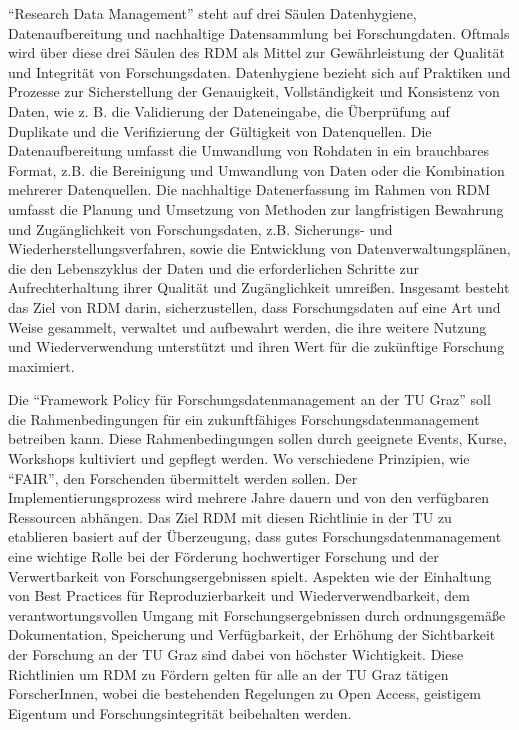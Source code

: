 \documentclass[9pt,english,ngerman]{scrartcl}
\begin{document}
``Research Data Management'' steht auf drei Säulen Datenhygiene, Datenaufbereitung und
nachhaltige Datensammlung bei Forschungdaten. Oftmals wird über
diese drei Säulen des RDM als Mittel zur Gewährleistung der Qualität und
Integrität von Forschungsdaten. Datenhygiene bezieht sich auf Praktiken
und Prozesse zur Sicherstellung der Genauigkeit, Vollständigkeit und
Konsistenz von Daten, wie z. B. die Validierung der Dateneingabe, die
Überprüfung auf Duplikate und die Verifizierung der Gültigkeit von Datenquellen.
Die Datenaufbereitung umfasst die Umwandlung von Rohdaten in ein brauchbares
Format, z.B. die Bereinigung und Umwandlung von Daten oder die Kombination
mehrerer Datenquellen. Die nachhaltige Datenerfassung im Rahmen von
RDM umfasst die Planung und Umsetzung von Methoden zur langfristigen
Bewahrung und Zugänglichkeit von Forschungsdaten, z.B.
Sicherungs- und Wiederherstellungsverfahren, sowie die Entwicklung
von Datenverwaltungsplänen, die den Lebenszyklus der Daten und
die erforderlichen Schritte zur Aufrechterhaltung ihrer Qualität
und Zugänglichkeit umreißen. Insgesamt besteht das Ziel von RDM darin,
sicherzustellen, dass Forschungsdaten auf eine Art und Weise gesammelt,
verwaltet und aufbewahrt werden, die ihre weitere Nutzung und
Wiederverwendung unterstützt und ihren Wert für die zukünftige Forschung maximiert.

Die ``Framework Policy für Forschungsdatenmanagement an der TU Graz'' soll die
Rahmenbedingungen für ein zukunftfähiges Forschungsdatenmanagement betreiben
kann. Diese Rahmenbedingungen sollen durch geeignete Events, Kurse, Workshops
kultiviert und gepflegt werden. Wo verschiedene Prinzipien, wie ``FAIR'', den
Forschenden übermittelt werden sollen. Der Implementierungsprozess wird mehrere
Jahre dauern und von den verfügbaren Ressourcen abhängen. Das Ziel RDM mit
diesen Richtlinie in der TU zu etablieren basiert auf der Überzeugung, dass
gutes Forschungsdatenmanagement eine wichtige Rolle bei der Förderung
hochwertiger Forschung und der Verwertbarkeit von Forschungsergebnissen spielt.
Aspekten wie der Einhaltung von Best Practices für Reproduzierbarkeit und
Wiederverwendbarkeit, dem verantwortungsvollen Umgang mit Forschungsergebnissen
durch ordnungsgemäße Dokumentation, Speicherung und Verfügbarkeit, der Erhöhung
der Sichtbarkeit der Forschung an der TU Graz sind dabei von höchster
Wichtigkeit. Diese Richtlinien um RDM zu Fördern gelten für alle an der TU Graz
tätigen ForscherInnen, wobei die bestehenden Regelungen zu Open Access,
geistigem Eigentum und Forschungsintegrität beibehalten werden.
\end{document}
